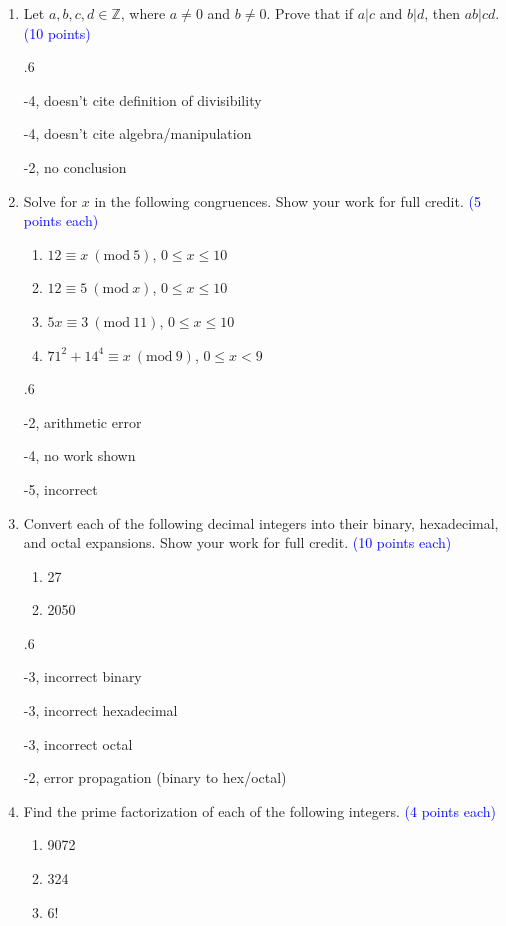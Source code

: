 \documentclass{article}
\newcommand{\pt}[1]{\textcolor{blue}{(#1 points)}}
\newcommand{\pte}[1]{\textcolor{blue}{(#1 points each)}}
\newcommand{\Mod}[1]{\ (\mathrm{mod}\ #1)}
\newenvironment{rubric}
{
\par
\begin{spacing}{.6}
\begin{itshape}
\color{red}

}
{
\end{itshape}
\end{spacing}
\par
}
\begin{document}
\clearpage
\begin{enumerate}



\item Let $a,b,c,d \in \mathbb{Z}$, where $a \neq 0$ and $b \neq 0$. Prove that if $a|c$ and $b|d$, then $ab|cd$. \pt{10}

\begin{rubric}
-4, doesn't cite definition of divisibility

-4, doesn't cite algebra/manipulation

-2, no conclusion
\end{rubric}

\item Solve for $x$ in the following congruences. Show your work for full credit. \pte{5}
\begin{enumerate}
    \item $12 \equiv x \Mod{5}$, $0 \leq x \leq 10$
    \item $12 \equiv 5 \Mod{x}$, $0 \leq x \leq 10$
    \item $5x \equiv 3\Mod{11}$, $0 \leq x \leq 10$
    \item $71^2 + 14^4 \equiv x\Mod{9}$, $0 \leq x < 9$
\end{enumerate}

\begin{rubric}
-2, arithmetic error

-4, no work shown

-5, incorrect
\end{rubric}

\item Convert each of the following decimal integers into their binary, hexadecimal, and octal expansions. Show your work for full credit. \pte{10}
\begin{enumerate}
    \item 27
    \item 2050
\end{enumerate}

\begin{rubric}
-3, incorrect binary

-3, incorrect hexadecimal

-3, incorrect octal

-2, error propagation (binary to hex/octal)
\end{rubric}

\item Find the prime factorization of each of the following integers. \pte{4}
\begin{enumerate}
    \item 9072
    \item 324
    \item 6!
\end{enumerate}


\end{enumerate}
\end{document}
